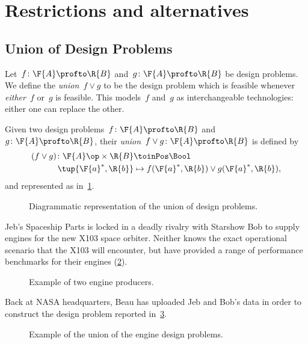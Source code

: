 

\section{Restrictions and alternatives}

\subsection{Union of Design Problems}
Let~$f\colon \F{A}\profto \R{B}$ and~$g\colon \F{A}\profto \R{B}$ be design problems. We define the \emph{union}~$f \vee g$ to be the design problem which is feasible whenever \emph{either}~$f$ or~$g$ is feasible.
This models~$f$ and~$g$ as interchangeable technologies: either one can replace the other.

\begin{definition}
  Given two design problems~$f \colon \F{A} \profto \R{B}$ and~$g \colon \F{A} \profto \R{B}$, their \emph{union}~$f \vee g \colon \F{A} \profto \R{B}$ is defined by
  \begin{equation}
    \begin{aligned}
    (f \vee g)
      \colon \F{A}\op \times \R{B} & \toinPos \Bool \\
      \tup{\F{a}^*, \R{b}} & \mapsto f(\F{a}^*, \R{b}) \vee g(\F{a}^*, \R{b}),
    \end{aligned}
  \end{equation}
  and represented as in~\cref{fig:uniondp}.
\end{definition}

\begin{figure}[h!]
  \begin{center}
  \end{center}
  \caption{Diagrammatic representation of the union of design problems. }
  \label{fig:uniondp}
\end{figure}

\begin{example}
  Jeb's Spaceship Parts is locked in a deadly rivalry with Starshow Bob to supply engines for the new X103 space orbiter. Neither knows the exact operational scenario that the X103 will encounter, but have provided a range of performance benchmarks for their engines (\cref{fig:exunion_1}).
  \begin{figure}[h!]
    \begin{center}
    \end{center}
    \caption{Example of two engine producers. }
    \label{fig:exunion_1}
  \end{figure}
  Back at NASA headquarters, Beau has uploaded Jeb and Bob's data in order to construct the design problem reported in~\cref{fig:exunion_2}.
  \begin{figure}[h!]
    \begin{center}
    \end{center}
    \caption{Example of the union of the engine design problems. }
    \label{fig:exunion_2}
  \end{figure}
\end{example}

